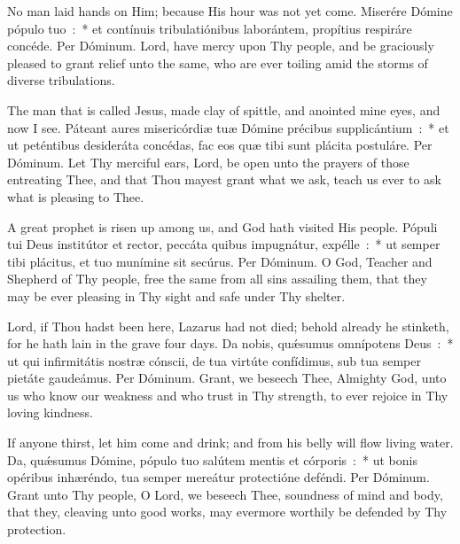 {{  
  {No man laid hands on Him; because His hour was not yet come.}
  {Miserére Dómine pópulo tuo~:~* et contínuis tribulatiónibus laborántem, propítius respiráre concéde. Per Dóminum.}
  {Lord, have mercy upon Thy people, and be graciously pleased to grant relief unto the same, who are ever toiling amid the storms of diverse tribulations.}

  {The man that is called Jesus, made clay of spittle, and anointed mine eyes, and now I see.}
  {Páteant aures misericórdiæ tuæ Dómine précibus supplicántium~:~* et ut peténtibus desideráta concédas, fac eos quæ tibi sunt plácita postuláre. Per Dóminum.}
  {Let Thy merciful ears, Lord, be open unto the prayers of those entreating Thee, and that Thou mayest grant what we ask, teach us ever to ask what is pleasing to Thee.}

  {A great prophet is risen up among us, and God hath visited His people.}
  {Pópuli tui Deus institútor et rector, peccáta quibus impugnátur, expélle~:~* ut semper tibi plácitus, et tuo munímine sit secúrus. Per Dóminum.}
  {O God, Teacher and Shepherd of Thy people, free the same from all sins assailing them, that they may be ever pleasing in Thy sight and safe under Thy shelter.}

  \let\vrtitle=\undefined
  {Lord, if Thou hadst been here, Lazarus had not died; behold already he stinketh, for he hath lain in the grave four days.}
  {Da nobis, quǽsumus omnípotens Deus~:~* ut qui infirmitátis nostræ cónscii, de tua virtúte confídimus, sub tua semper pietáte gaudeámus. Per Dóminum.}
  {Grant, we beseech Thee, Almighty God, unto us who know our weakness and who trust in Thy strength, to ever rejoice in Thy loving kindness.}
}
  
{
  \newcommand{\commvlatin}{Eripe me, Dómine, ab hómine \textbf{ma}lo.}
  \newcommand{\commrlatin}{A viro iníquo éri\textbf{pe} me.}
  \newcommand{\commvtranslation}{Deliver me, O Lord, from the wicked man.}
  \newcommand{\commrtranslation}{And save me from the evil-doer.}
  \newcommand{\vrtitle}{Eripe me}
  \newcommand{\vrlabel}{commvreripeme}
  {If anyone thirst, let him come and drink; and from his belly will flow living water.}
  {Da, quǽsumus Dómine, pópulo tuo salútem mentis et córporis~:~* ut bonis opéribus inhæréndo, tua semper mereátur protectióne deféndi. Per Dóminum.}
  {Grant unto Thy people, O Lord, we beseech Thee, soundness of mind and body, that they, cleaving unto good works, may evermore worthily be defended by Thy protection.}

}}
